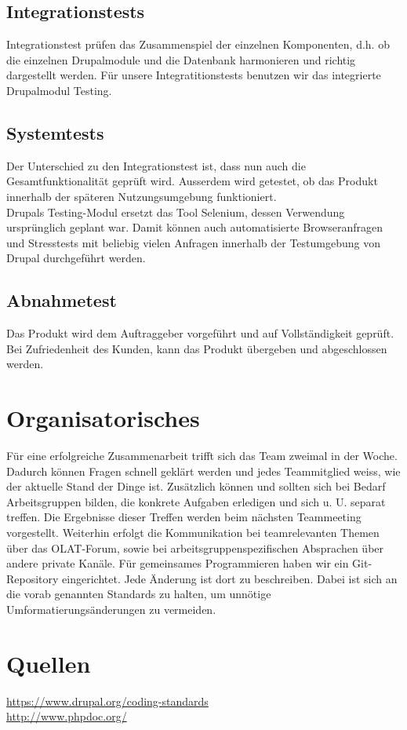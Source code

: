 \documentclass{swp}
\begin{document}
\subsection{Integrationstests}
Integrationstest pr\"ufen das Zusammenspiel der einzelnen Komponenten, d.h. ob die einzelnen Drupalmodule und die Datenbank harmonieren und richtig dargestellt werden.
F\"ur unsere Integratitionstests benutzen wir das integrierte Drupalmodul Testing.
\subsection{Systemtests}
Der Unterschied zu den Integrationstest ist, dass nun auch die Gesamtfunktionalit\"at gepr\"uft wird. Au{ss}erdem wird getestet, ob das Produkt innerhalb der sp\"ateren Nutzungsumgebung funktioniert.\\
Drupals \glqq Testing\grqq{}-Modul ersetzt das Tool Selenium, dessen Verwendung urspr\"unglich geplant war. Damit k\"onnen auch automatisierte Browseranfragen und Stresstests mit beliebig vielen Anfragen innerhalb der Testumgebung von Drupal durchgef\"uhrt werden.
\subsection{Abnahmetest}
Das Produkt wird dem Auftraggeber vorgef\"uhrt und auf Vollst\"andigkeit gepr\"uft. Bei Zufriedenheit des Kunden, kann das Produkt \"ubergeben und abgeschlossen werden.

\newpage
\section{Organisatorisches}
F\"ur eine erfolgreiche Zusammenarbeit trifft sich das Team zweimal in der Woche. Dadurch k\"onnen Fragen schnell gekl\"art werden und jedes Teammitglied wei{ss}, wie der aktuelle Stand der Dinge ist. Zus\"atzlich k\"onnen und sollten sich bei Bedarf Arbeitsgruppen bilden, die konkrete Aufgaben erledigen und sich u. U. separat treffen. Die Ergebnisse dieser Treffen werden beim n\"achsten Teammeeting vorgestellt. Weiterhin erfolgt die Kommunikation bei teamrelevanten Themen \"uber das OLAT-Forum, sowie bei arbeitsgruppenspezifischen Absprachen \"uber andere private Kan\"ale. 
F\"ur gemeinsames Programmieren haben wir ein Git-Repository eingerichtet. Jede \"Anderung ist dort zu beschreiben. Dabei ist sich an die vorab genannten Standards zu halten, um unn\"otige Umformatierungs\"anderungen zu vermeiden.

\newpage
\section{Quellen}
\url{https://www.drupal.org/coding-standards}\\
\url{http://www.phpdoc.org/}
\end{document}
